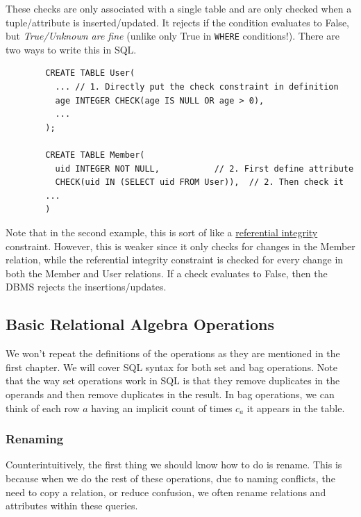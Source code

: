     \begin{definition}
      \label{def:tuple-attribute-based-checks}
      These checks are only associated with a single table and are only checked when a tuple/attribute is inserted/updated. It rejects if the condition evaluates to False, but \textit{True/Unknown are fine} (unlike only True in \texttt{WHERE} conditions!). There are two ways to write this in SQL. 
      \begin{lstlisting}
        CREATE TABLE User(
          ... // 1. Directly put the check constraint in definition
          age INTEGER CHECK(age IS NULL OR age > 0), 
          ...
        ); 

        CREATE TABLE Member(
          uid INTEGER NOT NULL,           // 2. First define attribute 
          CHECK(uid IN (SELECT uid FROM User)),  // 2. Then check it 
        ...
        )
      \end{lstlisting}
      Note that in the second example, this is sort of like a \hyperref[def:referential-integrity]{referential integrity} constraint. However, this is weaker since it only checks for changes in the Member relation, while the referential integrity constraint is checked for every change in both the Member and User relations. If a check evaluates to False, then the DBMS rejects the insertions/updates. 
    \end{definition}

\subsection{Basic Relational Algebra Operations} 

  We won't repeat the definitions of the operations as they are mentioned in the first chapter. We will cover SQL syntax for both set and bag operations. Note that the way set operations work in SQL is that they remove duplicates in the operands and then remove duplicates in the result. In bag operations, we can think of each row $a$ having an implicit count of times $c_a$ it appears in the table.  

  \subsubsection{Renaming}
    
    Counterintuitively, the first thing we should know how to do is rename. This is because when we do the rest of these operations, due to naming conflicts, the need to copy a relation, or reduce confusion, we often rename relations and attributes within these queries. 

